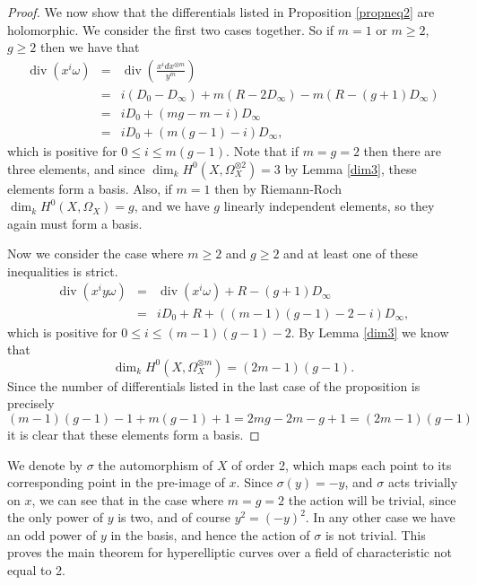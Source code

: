 \documentclass[11pt]{article} %
\theoremstyle{plain}
\theoremstyle{remark}
\DeclareMathOperator{\di}{div}
\begin{document}
\begin{proof}
We now show that the differentials listed in Proposition \ref{propneq2} are holomorphic.
We consider the first two cases together.
So if $m=1$ or $m\geq 2$, $g\geq 2$ then we have that
\begin{eqnarray*}
 \di(x^i\omega) & = & \di \left( \frac{x^idx^{\otimes m}}{y^m} \right)\\ & = & i(D_0 -D_\infty) + m(R-2D_\infty) -m(R-(g+1)D_\infty) \\
 & = & iD_0 + (mg -m -i)D_\infty \\
 & = & iD_0 + (m(g-1) -i)D_\infty,
\end{eqnarray*}
which is positive for $0\leq i \leq m(g-1)$.
Note that if $m=g=2$ then there are three elements, and since $\dim_kH^0(X,\Omega_X^{\otimes 2})=3$ by Lemma \ref{dim3}, these elements form a basis.
Also, if $m=1$ then by Riemann-Roch $\dim_k H^0(X,\Omega_X)=g$, and we have $g$ linearly independent elements, so they again must form a basis.

\begin{comment}
If $m=g=2$ then we have that
\begin{eqnarray*}
 \di\left(\frac{x^idx^{\otimes 2}}{y^2}\right) & = & i(D_0-D_\infty) + 2(R-2D_\infty) - 2(R-(g+1)D_\infty) \\
 & = & iD_0+ ((2g-2)-i)D_\infty \\
 & = & iD_0 +(2-i)D_\infty,
\end{eqnarray*}
which is positive for $0\leq 2$.
By Lemma \ref{dim3} then $\dim_kH^0(X,\Omega_X^{\otimes 2})=3$, so again, we have three linearly independent elements, so they must form a basis.
\end{comment}


Now we consider the case where $m\geq 2$ and $g \geq 2$ and at least one of these inequalities is strict.
\begin{eqnarray*}
 \di (x^iy\omega) & = & \di(x^i\omega) + R -(g+1)D_\infty \\
 & = & iD_0 + R +((m-1)(g-1)-2-i)D_\infty,
\end{eqnarray*}
which is positive for $0\leq i \leq (m-1)(g-1)-2$.
By Lemma \ref{dim3} we know that 
\[
\dim_kH^0(X,\Omega_X^{\otimes m}) = (2m-1)(g-1).
\]
Since the number of differentials listed in the last case of the proposition is precisely
\[
 (m-1)(g-1)-1 + m(g-1) +1 = 2mg -2m -g + 1 = (2m-1)(g-1)
\]
it is clear that these elements form a basis.
\end{proof}

We denote by $\sigma$ the automorphism of $X$ of order 2, which maps each point to its corresponding point in the pre-image of $x$.
Since $\sigma(y) = -y$, and $\sigma$ acts trivially on $x$, we can see that in the case where $m=g=2$ the action will be trivial, since the only power of $y$ is two, and of course $y^2 = (-y)^2$.
In any other case we have an odd power of $y$ in the basis, and hence the action of $\sigma$ is not trivial.
This proves the main theorem for hyperelliptic curves over a field of characteristic not equal to 2.
\end{document}
